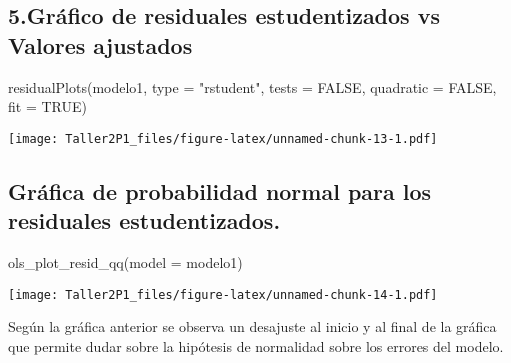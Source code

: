 \documentclass[
]{article}
\newenvironment{Shaded}{\begin{snugshade}}{\end{snugshade}}
\newcommand{\AttributeTok}[1]{\textcolor[rgb]{0.77,0.63,0.00}{#1}}
\newcommand{\CommentTok}[1]{\textcolor[rgb]{0.56,0.35,0.01}{\textit{#1}}}
\newcommand{\ConstantTok}[1]{\textcolor[rgb]{0.00,0.00,0.00}{#1}}
\newcommand{\FunctionTok}[1]{\textcolor[rgb]{0.00,0.00,0.00}{#1}}
\newcommand{\NormalTok}[1]{#1}
\newcommand{\StringTok}[1]{\textcolor[rgb]{0.31,0.60,0.02}{#1}}
\begin{document}
\hypertarget{gruxe1fico-de-residuales-estudentizados-vs-valores-ajustados}{%
\subsection{5.Gráfico de residuales estudentizados vs Valores
ajustados}\label{gruxe1fico-de-residuales-estudentizados-vs-valores-ajustados}}

\begin{Shaded}
\begin{Highlighting}[]
\FunctionTok{residualPlots}\NormalTok{(modelo1, }\AttributeTok{type =} \StringTok{"rstudent"}\NormalTok{, }\AttributeTok{tests =} \ConstantTok{FALSE}\NormalTok{, }\AttributeTok{quadratic =} \ConstantTok{FALSE}\NormalTok{, }\AttributeTok{fit =} \ConstantTok{TRUE}\NormalTok{)}
\end{Highlighting}
\end{Shaded}

\texttt{[image: Taller2P1\_files/figure-latex/unnamed-chunk-13-1.pdf]}

\hypertarget{gruxe1fica-de-probabilidad-normal-para-los-residuales-estudentizados.}{%
\subsection{Gráfica de probabilidad normal para los residuales
estudentizados.}\label{gruxe1fica-de-probabilidad-normal-para-los-residuales-estudentizados.}}

\begin{Shaded}
\begin{Highlighting}[]
\FunctionTok{ols\_plot\_resid\_qq}\NormalTok{(}\AttributeTok{model =}\NormalTok{ modelo1)}
\end{Highlighting}
\end{Shaded}

\texttt{[image: Taller2P1\_files/figure-latex/unnamed-chunk-14-1.pdf]}

\begin{Shaded}
\end{Shaded}

Según la gráfica anterior se observa un desajuste al inicio y al final
de la gráfica que permite dudar sobre la hipótesis de normalidad sobre
los errores del modelo.
\end{document}
